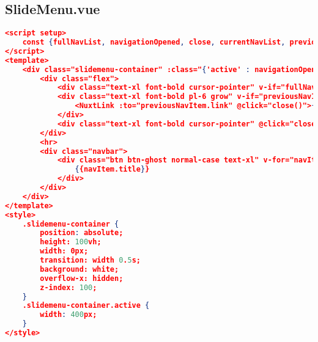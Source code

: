 \subsection{SlideMenu.vue}
\label{SlideMenu.vue}

\begin{lstlisting}[language=json,firstnumber=1]
<script setup>
    const {fullNavList, navigationOpened, close, currentNavList, previousNavItem, navigate, back} = useNavigation();
</script>
<template>
    <div class="slidemenu-container" :class="{'active' : navigationOpened}">
        <div class="flex">
            <div class="text-xl font-bold cursor-pointer" v-if="fullNavList != currentNavList" @click="back()">back</div>
            <div class="text-xl font-bold pl-6 grow" v-if="previousNavItem">
                <NuxtLink :to="previousNavItem.link" @click="close()">{{previousNavItem.title}}</NuxtLink>
            </div>
            <div class="text-xl font-bold cursor-pointer" @click="close()">X</div>
        </div>
        <hr>
        <div class="navbar">
            <div class="btn btn-ghost normal-case text-xl" v-for="navItem in currentNavList" :key="navItem.uid" @click="navigate(navItem)">
                {{navItem.title}}
            </div>
        </div>
    </div>
</template>
<style>
    .slidemenu-container {
        position: absolute;
        height: 100vh;
        width: 0px;
        transition: width 0.5s;
        background: white;
        overflow-x: hidden;
        z-index: 100;
    }
    .slidemenu-container.active {
        width: 400px;
    }
</style>
\end{lstlisting}
\clearpage



